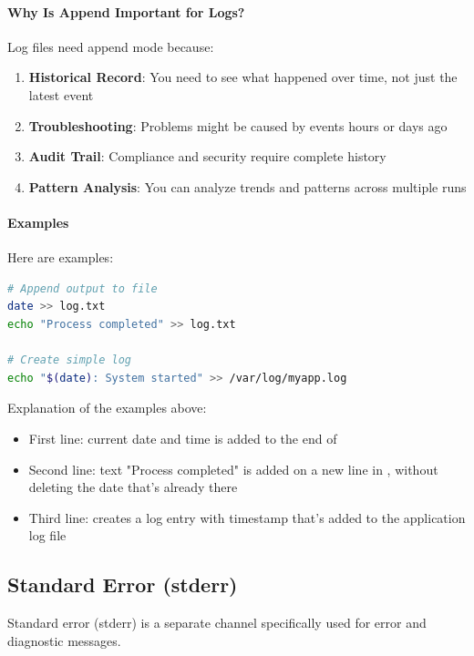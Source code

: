 \paragraph{Why Is Append Important for Logs?}

Log files need append mode because:
\begin{enumerate}
	\item \textbf{Historical Record}: You need to see what happened over time, not just the latest event
	\item \textbf{Troubleshooting}: Problems might be caused by events hours or days ago
	\item \textbf{Audit Trail}: Compliance and security require complete history
	\item \textbf{Pattern Analysis}: You can analyze trends and patterns across multiple runs
\end{enumerate}

\paragraph{Examples}

Here are examples:

\begin{lstlisting}[language=bash, caption={Redirecting stdout with append}]
# Append output to file
date >> log.txt
echo "Process completed" >> log.txt

# Create simple log
echo "$(date): System started" >> /var/log/myapp.log
\end{lstlisting}

Explanation of the examples above:
\begin{itemize}
	\item First line: current date and time is added to the end of 
	\item Second line: text "Process completed" is added on a new line in , without deleting the date that's already there
	\item Third line: creates a log entry with timestamp that's added to the application log file
\end{itemize}

\subsection{Standard Error (stderr)}

Standard error (stderr) is a separate channel specifically used for error and diagnostic messages.

